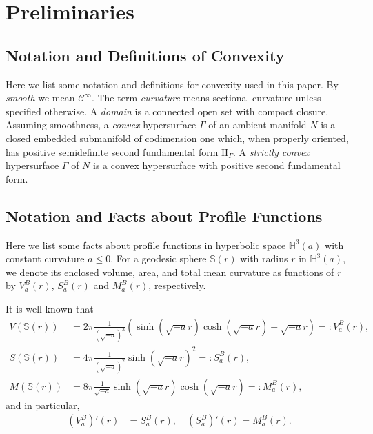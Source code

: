 \documentclass[11pt]{amsart}
\theoremstyle{definition}
\newcommand{\C}{\mathcal{C}}
\newcommand{\HH}{\mathbb{H}}
\newcommand{\SSS}{\mathbb{S}}
\theoremstyle{remark}
\numberwithin{equation}{section}
\begin{document}
	\section{Preliminaries}\label{sec:1}
	
		\subsection{Notation and Definitions of Convexity}
		Here we list some notation and definitions for convexity used in this paper. By \emph{smooth} we mean $\C^\infty$. The term \emph{curvature} means sectional curvature unless specified otherwise. A \emph{domain} is a connected open set with compact closure.
		Assuming smoothness, a \emph{convex} hypersurface $\Gamma$ of an ambient manifold $N$ is a closed embedded submanifold of codimension one which, when properly oriented, has positive semidefinite second fundamental form $\mathrm{I\!I}_\Gamma$. A \emph{strictly convex} hypersurface $\Gamma$ of $N$ is a convex hypersurface with positive second fundamental form. %
	
		\subsection{Notation and Facts about Profile Functions}
		Here we list some facts about profile functions in hyperbolic space $\HH^3(a)$ with constant curvature $a \leq 0$. For a geodesic sphere $\SSS(r)$ with radius $r$ in $\HH^3(a)$, we denote its enclosed volume, area, and total mean curvature as functions of $r$ by $V_{a}^{B}(r) $, $S_{a}^{B}(r)$ and $M_{a}^{B}(r)$, respectively. 
		
		It is well known that
		\begin{align}\label{note1.defn.VSM}
			V(\SSS(r)) &= 2\pi \frac{1}{\left(\sqrt{-a}\right)^3}
			\left( \sinh(\sqrt{-a}r) \cosh(\sqrt{-a}r) - \sqrt{-a}r \right) =: V_{a}^{B}(r),
			\\
			\nonumber
			S(\SSS(r)) &= 4\pi \frac{1}{\left(\sqrt{-a}\right)^2} \sinh(\sqrt{-a}r)^2 =: S_{a}^{B}(r),
			\\
			\nonumber
			M(\SSS(r)) &= 8\pi \frac{1}{\sqrt{-a}} \sinh(\sqrt{-a}r) \cosh(\sqrt{-a}r) =: M_{a}^{B}(r),
		\end{align}
		and in particular,
		\begin{align}\label{note1.eq.derivative}
			(V_{a}^{B})'(r) &= S_{a}^{B}(r), \quad
			(S_{a}^{B})'(r) = M_{a}^{B}(r).
		\end{align}
		
\end{document}

